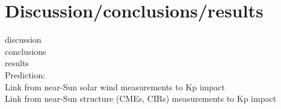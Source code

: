 \chapter[Discussion and results]{Discussion/conclusions/results}


discussion\\
conclusions\\
results\\

Prediction:\\
Link from near-Sun solar wind measurements to Kp impact\\
Link from near-Sun structure (CMEs, CIRs) measurements to Kp impact\\

